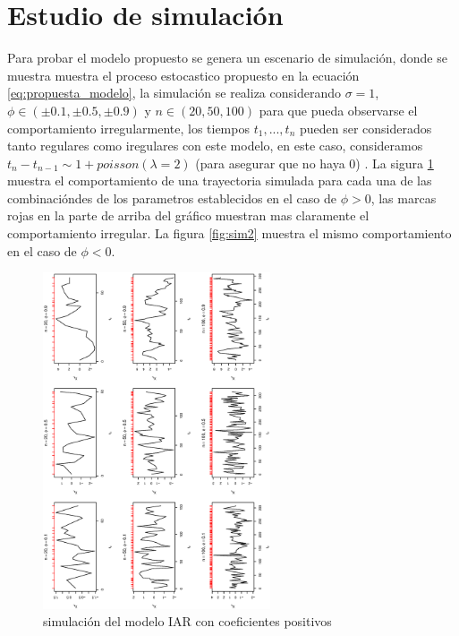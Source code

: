 \section{Estudio de simulación}
Para probar el modelo propuesto se genera un escenario de simulación, donde se muestra muestra el proceso estocastico propuesto
en la ecuación \ref{eq:propuesta_modelo}, la simulación se realiza considerando $\sigma = 1$, $\phi \in (\pm 0.1 ,\pm 0.5,\pm 0.9)$ y $n \in (20, 50, 100)$ para que pueda
observarse el comportamiento irregularmente, los tiempos $t_1 , ... , t_n$ pueden ser considerados tanto regulares como iregulares con este modelo, en este caso, consideramos
$t_n - t_{n-1} \sim 1 + poisson(\lambda = 2)$ (para asegurar que no haya 0) . La sigura \ref{fig:sim1} muestra el comportamiento
de una trayectoria simulada para cada una de las combinacióndes de los parametros establecidos en el caso de $\phi > 0$, las marcas rojas en la parte de arriba del gráfico
muestran mas claramente el comportamiento irregular. La figura \ref{fig:sim2} muestra el mismo comportamiento en el caso de $\phi < 0$.
\begin{figure}[h]
    \includegraphics[width=0.6\textwidth, angle = 270]{Kap3/Fig_Cap3/sim1.eps}
    \caption{simulación del modelo IAR con coeficientes positivos}
    \label{fig:sim1}
\end{figure}



